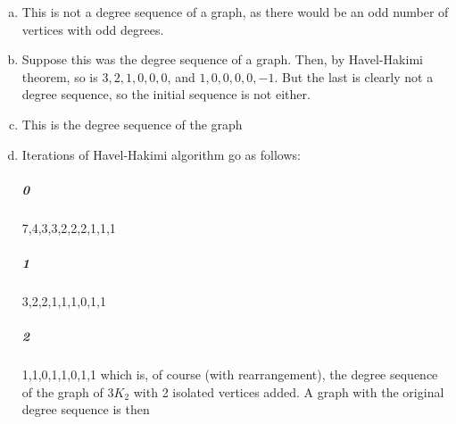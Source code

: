 \begin{enumerate}[(a)]
	\item This is not a degree sequence of a graph, as there would be an odd
		number of vertices with odd degrees.
	\item Suppose this was the degree sequence of a graph. Then, by Havel-Hakimi
		theorem, so is $3,2,1,0,0,0$, and $1,0,0,0,0,-1$. But the last is clearly
		not a degree sequence, so the initial sequence is not either.
	\item This is the degree sequence of the graph \\
	\item Iterations of Havel-Hakimi algorithm go as follows:
\subparagraph{0} 7,4,3,3,2,2,2,1,1,1
\subparagraph{1}   3,2,2,1,1,1,0,1,1
\subparagraph{2}     1,1,0,1,1,0,1,1 which is, of course (with rearrangement), the degree sequence of the graph of $3K_2$ with 2 isolated vertices added.
A graph with the original degree sequence is then \\
\end{enumerate}
